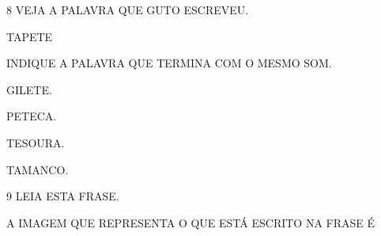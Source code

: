 \vspace{0.5cm}

\num{8} VEJA A PALAVRA QUE GUTO ESCREVEU.

\begin{myquote}
\centering\LARGE{TAPETE}
\end{myquote}

INDIQUE A PALAVRA QUE TERMINA COM O MESMO SOM.

\begin{escolha}%
\item GILETE.

\item PETECA.

\item TESOURA.

\item TAMANCO.
\end{escolha}


\pagebreak

\num{9} LEIA ESTA FRASE.

\begin{myquote}
\large{}
\end{myquote}

A IMAGEM QUE REPRESENTA O QUE ESTÁ ESCRITO NA FRASE É


